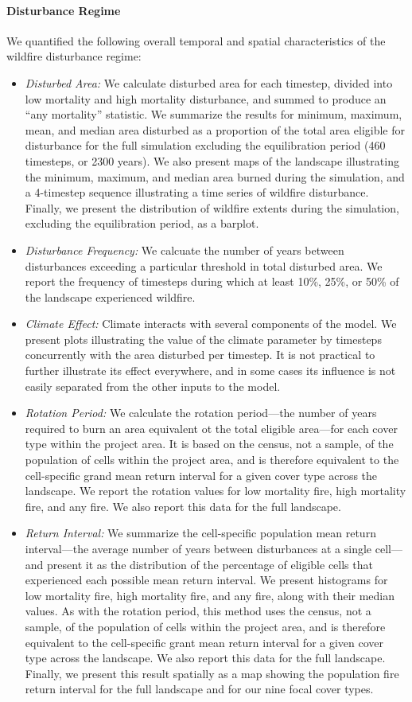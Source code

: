 \paragraph{Disturbance Regime} We quantified the following overall temporal and spatial characteristics of the wildfire disturbance regime:
\begin{itemize}
	\item \emph{Disturbed Area:} We calculate disturbed area for each timestep, divided into low mortality and high mortality disturbance, and summed to produce an ``any mortality'' statistic. We summarize the results for minimum, maximum, mean, and median area disturbed as a proportion of the total area eligible for disturbance for the full simulation excluding the equilibration period (460 timesteps, or 2300 years). We also present maps of the landscape illustrating the minimum, maximum, and median area burned during the simulation, and a 4-timestep sequence illustrating a time series of wildfire disturbance. Finally, we present the distribution of wildfire extents during the simulation, excluding the equilibration period, as a barplot.
	\item \emph{Disturbance Frequency:} We calcuate the number of years between disturbances exceeding a particular threshold in total disturbed area. We report the frequency of timesteps during which at least 10\%, 25\%, or 50\% of the landscape experienced wildfire.
	\item \emph{Climate Effect:} Climate interacts with several components of the model. We present plots illustrating the value of the climate parameter by timesteps concurrently with the area disturbed per timestep. It is not practical to further illustrate its effect everywhere, and in some cases its influence is not easily separated from the other inputs to the model. 
	\item \emph{Rotation Period:} We calculate the rotation period---the number of years required to burn an area equivalent ot the total eligible area---for each cover type within the project area. It is based on the census, not a sample, of the population of cells within the project area, and is therefore equivalent to the cell-specific grand mean return interval for a given cover type across the landscape. We report the rotation values for low mortality fire, high mortality fire, and any fire. We also report this data for the full landscape.
	\item \emph{Return Interval:} We summarize the cell-specific population mean return interval---the average number of years between disturbances at a single cell---and present it as the distribution of the percentage of eligible cells that experienced each possible mean return interval. We present histograms for low mortality fire, high mortality fire, and any fire, along with their median values. As with the rotation period, this method uses the census, not a sample, of the population of cells within the project area, and is therefore equivalent to the cell-specific grant mean return interval for a given cover type across the landscape. We also report this data for the full landscape. Finally, we present this result spatially as a map showing the population fire return interval for the full landscape and for our nine focal cover types.

\end{itemize}
